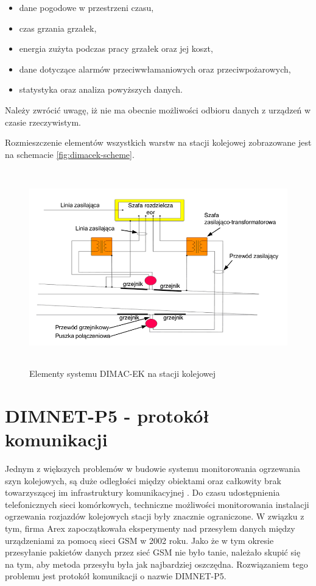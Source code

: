 \begin{itemize}
\item dane pogodowe w przestrzeni czasu,
\item czas grzania grzałek,
\item energia zużyta podczas pracy grzałek oraz jej koszt,
\item dane dotyczące alarmów przeciwwłamaniowych oraz przeciwpożarowych,
\item statystyka oraz analiza powyższych danych.
\end{itemize}

Należy zwrócić uwagę, iż nie ma obecnie możliwości odbioru danych z urządzeń w czasie rzeczywistym.

Rozmieszczenie elementów wszystkich warstw na stacji kolejowej zobrazowane jest na schemacie \ref{fig:dimacek-scheme}.

\begin{figure}[t]
	\includegraphics[height=85mm]{./img/dimacek_tory.png}
	\caption{Elementy systemu DIMAC-EK na stacji kolejowej \cite{arex-materials}}
	\label{fig:dimacek_tory}
\end{figure}

\section{DIMNET-P5 - protokół komunikacji}
Jednym z większych problemów w budowie systemu monitorowania ogrzewania szyn kolejowych, są duże odległości między obiektami oraz całkowity brak towarzyszącej im infrastruktury komunikacyjnej \cite{dimnetp5-spec}. Do czasu udostępnienia telefonicznych sieci komórkowych, techniczne możliwości monitorowania instalacji ogrzewania rozjazdów kolejowych stacji były znacznie ograniczone. W związku z tym, firma Arex zapoczątkowała eksperymenty nad przesyłem danych między urządzeniami za pomocą sieci GSM w 2002 roku. Jako że w tym okresie przesyłanie pakietów danych przez sieć GSM nie było tanie, należało skupić się na tym, aby metoda przesyłu była jak najbardziej oszczędna. Rozwiązaniem tego problemu jest protokół komunikacji o nazwie DIMNET-P5.

